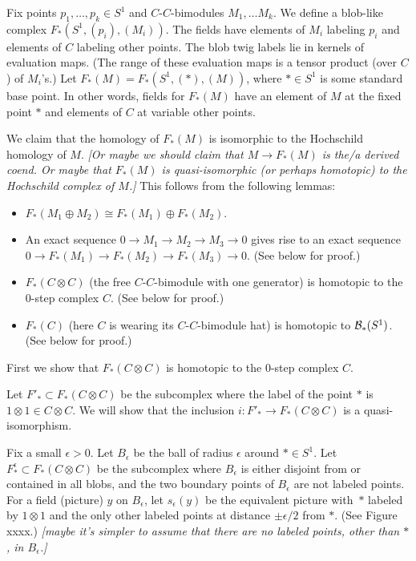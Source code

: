 \documentclass[11pt,leqno]{article}
\def\bc{{\cal B}}
\def\sub{\subset}
\def\ep{\epsilon}
\def\nn#1{{{\it \small [#1]}}}
\begin{document}
Fix points $p_1, \ldots, p_k \in S^1$ and $C$-$C$-bimodules $M_1, \ldots M_k$.
We define a blob-like complex $F_*(S^1, (p_i), (M_i))$.
The fields have elements of $M_i$ labeling $p_i$ and elements of $C$ labeling
other points.
The blob twig labels lie in kernels of evaluation maps.
(The range of these evaluation maps is a tensor product (over $C$) of $M_i$'s.)
Let $F_*(M) = F_*(S^1, (*), (M))$, where $* \in S^1$ is some standard base point.
In other words, fields for $F_*(M)$ have an element of $M$ at the fixed point $*$
and elements of $C$ at variable other points.

We claim that the homology of $F_*(M)$ is isomorphic to the Hochschild
homology of $M$.
\nn{Or maybe we should claim that $M \to F_*(M)$ is the/a derived coend.
Or maybe that $F_*(M)$ is quasi-isomorphic (or perhaps homotopic) to the Hochschild
complex of $M$.}
This follows from the following lemmas:
\begin{itemize}
\item $F_*(M_1 \oplus M_2) \cong F_*(M_1) \oplus F_*(M_2)$.
\item An exact sequence $0 \to M_1 \to M_2 \to M_3 \to 0$
gives rise to an exact sequence $0 \to F_*(M_1) \to F_*(M_2) \to F_*(M_3) \to 0$.
(See below for proof.)
\item $F_*(C\otimes C)$ (the free $C$-$C$-bimodule with one generator) is
homotopic to the 0-step complex $C$.
(See below for proof.)
\item $F_*(C)$ (here $C$ is wearing its $C$-$C$-bimodule hat) is homotopic to $\bc_*(S^1)$.
(See below for proof.)
\end{itemize}

First we show that $F_*(C\otimes C)$ is
homotopic to the 0-step complex $C$.

Let $F'_* \sub F_*(C\otimes C)$ be the subcomplex where the label of  
the point $*$ is $1 \otimes 1 \in C\otimes C$.
We will show that the inclusion $i: F'_* \to F_*(C\otimes C)$ is a quasi-isomorphism.

Fix a small $\ep > 0$.
Let $B_\ep$ be the ball of radius $\ep$ around $* \in S^1$.
Let $F^\ep_* \sub F_*(C\otimes C)$ be the subcomplex where $B_\ep$ is either disjoint from
or contained in all blobs, and the two boundary points of $B_\ep$ are not labeled points.
For a field (picture) $y$ on $B_\ep$, let $s_\ep(y)$ be the equivalent picture with~$*$
labeled by $1\otimes 1$ and the only other labeled points at distance $\pm\ep/2$ from $*$.
(See Figure xxxx.)
\nn{maybe it's simpler to assume that there are no labeled points, other than $*$, in $B_\ep$.}
\end{document}
